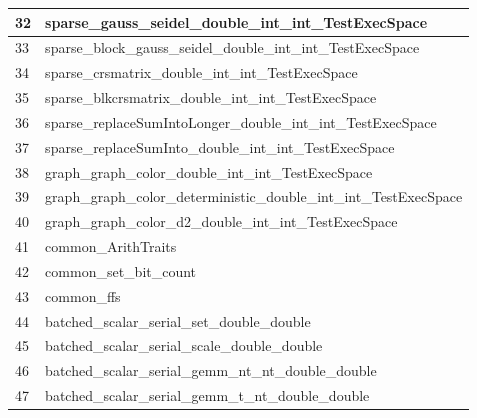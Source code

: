 \begin{table}[!htbp]
{\begin{tabular}{|>{\columncolor[HTML]{34FF34}}l |l|}
            \cellcolor[HTML]{FF00FF}32 & sparse\_gauss\_seidel\_double\_int\_int\_TestExecSpace              \\ \hline
            \cellcolor[HTML]{FF00FF}33 & sparse\_block\_gauss\_seidel\_double\_int\_int\_TestExecSpace       \\ \hline
            \cellcolor[HTML]{FF00FF}34 & sparse\_crsmatrix\_double\_int\_int\_TestExecSpace                  \\ \hline
            \cellcolor[HTML]{FF00FF}35 & sparse\_blkcrsmatrix\_double\_int\_int\_TestExecSpace               \\ \hline
            \cellcolor[HTML]{FF00FF}36 & sparse\_replaceSumIntoLonger\_double\_int\_int\_TestExecSpace       \\ \hline
            \cellcolor[HTML]{FF00FF}37 & sparse\_replaceSumInto\_double\_int\_int\_TestExecSpace             \\ \hline
            \cellcolor[HTML]{FF00FF}38 & graph\_graph\_color\_double\_int\_int\_TestExecSpace                \\ \hline
            \cellcolor[HTML]{FF00FF}39 & graph\_graph\_color\_deterministic\_double\_int\_int\_TestExecSpace \\ \hline
            \cellcolor[HTML]{FF00FF}40 & graph\_graph\_color\_d2\_double\_int\_int\_TestExecSpace            \\ \hline
            \cellcolor[HTML]{FF00FF}41 & common\_ArithTraits                                                 \\ \hline
            42                         & common\_set\_bit\_count                                             \\ \hline
            43                         & common\_ffs                                                         \\ \hline
            \cellcolor[HTML]{FE0000}44 & batched\_scalar\_serial\_set\_double\_double                        \\ \hline
            45                         & batched\_scalar\_serial\_scale\_double\_double                      \\ \hline
            46                         & batched\_scalar\_serial\_gemm\_nt\_nt\_double\_double               \\ \hline
            47                         & batched\_scalar\_serial\_gemm\_t\_nt\_double\_double                \\ \hline
            \end{tabular}

}
\end{table}
